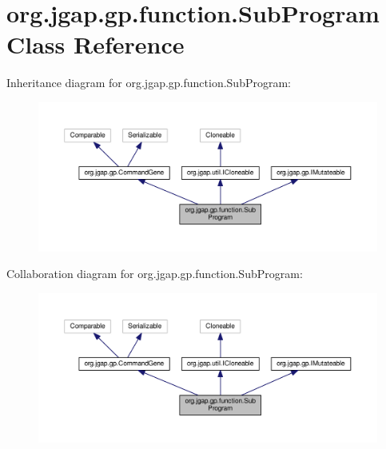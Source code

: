 \hypertarget{classorg_1_1jgap_1_1gp_1_1function_1_1_sub_program}{\section{org.\-jgap.\-gp.\-function.\-Sub\-Program Class Reference}
\label{classorg_1_1jgap_1_1gp_1_1function_1_1_sub_program}
}


Inheritance diagram for org.\-jgap.\-gp.\-function.\-Sub\-Program\-:
\nopagebreak
\begin{figure}[H]
\begin{center}
\leavevmode
\includegraphics[width=350pt]{classorg_1_1jgap_1_1gp_1_1function_1_1_sub_program__inherit__graph}
\end{center}
\end{figure}


Collaboration diagram for org.\-jgap.\-gp.\-function.\-Sub\-Program\-:
\nopagebreak
\begin{figure}[H]
\begin{center}
\leavevmode
\includegraphics[width=350pt]{classorg_1_1jgap_1_1gp_1_1function_1_1_sub_program__coll__graph}
\end{center}
\end{figure}
